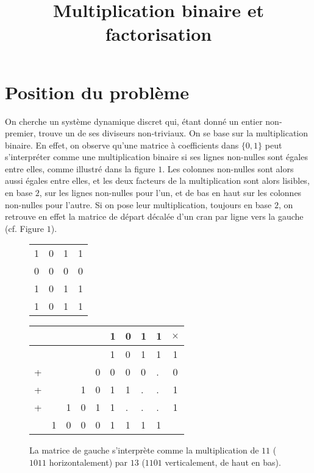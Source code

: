 \documentclass[11pt, openany]{article}
\begin{document}
\renewcommand{\labelitemi}{$\bullet$}

\title{Multiplication binaire et factorisation}
\date{}
\author{}
\maketitle



\section*{Position du problème}


On cherche un système dynamique discret qui, étant donné un entier non-premier, trouve un de ses diviseurs non-triviaux. On se base sur la multiplication binaire. En effet, on observe qu'une matrice à coefficients dans $\{0,1\}$ peut s'interpréter comme une multiplication binaire si ses lignes non-nulles sont égales entre elles, comme illustré dans la figure $1$. Les colonnes non-nulles sont alors aussi égales entre elles, et les deux facteurs de la multiplication sont alors lisibles, en base $2$, sur les lignes non-nulles pour l'un, et de bas en haut sur les colonnes non-nulles pour l'autre. Si on pose leur multiplication, toujours en base $2$, on retrouve en effet la matrice de départ décalée d'un cran par ligne vers la gauche (cf. Figure $1$).




\begin{figure}[h]
\centering
\begin{minipage}[]{0.25\linewidth}

\begin{tabular}{cccc}
1&0&1&1\\
0&0&0&0\\
1&0&1&1\\
1&0&1&1\\
\end{tabular}

\end{minipage}
\quad
\begin{minipage}[]{0.4\linewidth}


\begin{tabular}{lllllllll|c}
&&&&&1&0&1&1&$\times$\\
\hline
&&&&&1&0&1&1&1\\
+&&&&0&0&0&0&.&0 \\
+&&&1&0&1&1&.&.&1\\
+&&1&0&1&1&.&.&.&1\\
\hline
&1&0&0&0&1&1&1&1&\\
\end{tabular}
\end{minipage}
\caption{La matrice de gauche s'interprète comme la multiplication de $11$ ($1011$ horizontalement) par $13$ ($1101$ verticalement, de haut en bas).}
\end{figure}
\end{document}
